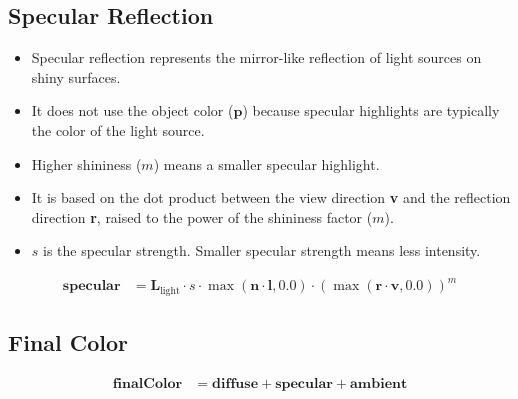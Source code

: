 \documentclass{article}
\begin{document}
	\subsection*{Specular Reflection}
	\begin{itemize}
		\item Specular reflection represents the mirror-like reflection of light sources on shiny surfaces.
		\item It does not use the object color ($\bm{p}$) because specular highlights are typically the color of the light source.
		\item Higher shininess ($m$) means a smaller specular highlight.
	\end{itemize}
	\begin{itemize}
		\item It is based on the dot product between the view direction \textbf{v} and the reflection direction \textbf{r}, raised to the power of the shininess factor ($m$).
		\item $s$ is the specular strength. Smaller specular strength means less intensity.
	\end{itemize}
	\begin{align*}
		\bm{specular} &= \bm{L}_{\text{light}} \cdot s \cdot \max(\bm{n} \cdot \bm{l}, 0.0) \cdot \left(\max(\bm{r} \cdot \bm{v}, 0.0)\right)^m
	\end{align*}
	
	\subsection*{Final Color}
	\begin{align*}
		\bm{finalColor} &= \bm{diffuse} + \bm{specular} + \bm{ambient}
	\end{align*}
	
\end{document}
